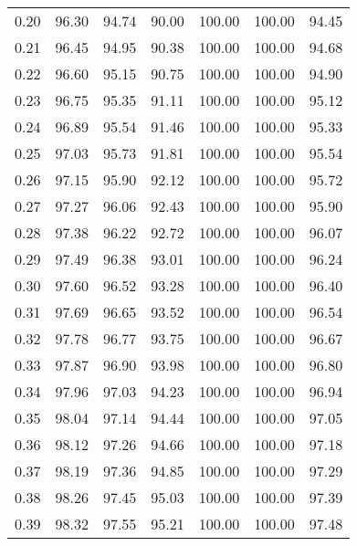 \begin{tabular}{|c|c|c|c|c|c|c|}
      0.20 &     96.30 &     94.74 &      90.00 &  100.00 &     100.00 &         94.45 \\
      0.21 &     96.45 &     94.95 &      90.38 &  100.00 &     100.00 &         94.68 \\
      0.22 &     96.60 &     95.15 &      90.75 &  100.00 &     100.00 &         94.90 \\
      0.23 &     96.75 &     95.35 &      91.11 &  100.00 &     100.00 &         95.12 \\
      0.24 &     96.89 &     95.54 &      91.46 &  100.00 &     100.00 &         95.33 \\
      0.25 &     97.03 &     95.73 &      91.81 &  100.00 &     100.00 &         95.54 \\
      0.26 &     97.15 &     95.90 &      92.12 &  100.00 &     100.00 &         95.72 \\
      0.27 &     97.27 &     96.06 &      92.43 &  100.00 &     100.00 &         95.90 \\
      0.28 &     97.38 &     96.22 &      92.72 &  100.00 &     100.00 &         96.07 \\
      0.29 &     97.49 &     96.38 &      93.01 &  100.00 &     100.00 &         96.24 \\
      0.30 &     97.60 &     96.52 &      93.28 &  100.00 &     100.00 &         96.40 \\
      0.31 &     97.69 &     96.65 &      93.52 &  100.00 &     100.00 &         96.54 \\
      0.32 &     97.78 &     96.77 &      93.75 &  100.00 &     100.00 &         96.67 \\
      0.33 &     97.87 &     96.90 &      93.98 &  100.00 &     100.00 &         96.80 \\
      0.34 &     97.96 &     97.03 &      94.23 &  100.00 &     100.00 &         96.94 \\
      0.35 &     98.04 &     97.14 &      94.44 &  100.00 &     100.00 &         97.05 \\
      0.36 &     98.12 &     97.26 &      94.66 &  100.00 &     100.00 &         97.18 \\
      0.37 &     98.19 &     97.36 &      94.85 &  100.00 &     100.00 &         97.29 \\
      0.38 &     98.26 &     97.45 &      95.03 &  100.00 &     100.00 &         97.39 \\
      0.39 &     98.32 &     97.55 &      95.21 &  100.00 &     100.00 &         97.48 \\

\end{tabular}
